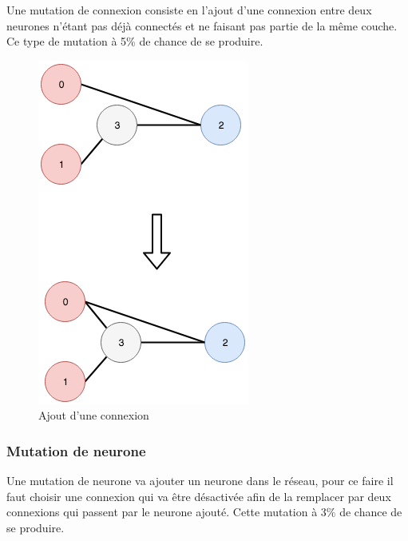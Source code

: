\documentclass{article}
\begin{document}
Une mutation de connexion consiste en l'ajout d'une connexion entre deux neurones n'étant pas déjà connectés et ne faisant pas partie de la même couche. Ce type de mutation à 5\% de chance de se produire.

\begin{figure}[H]
\begin{center}
	\includegraphics[scale=0.4]{addlink.png}
	\caption{Ajout d'une connexion}
\end{center}
\end{figure}

\subsubsection{Mutation de neurone}

Une mutation de neurone va ajouter un neurone dans le réseau, pour ce faire il faut choisir une connexion qui va être désactivée afin de la remplacer par deux connexions qui passent par le neurone ajouté. Cette mutation à 3\% de chance de se produire.
\end{document}
